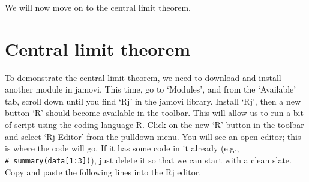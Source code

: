 \documentclass[
  openany]{krantz}
\begin{document}
\begin{verbatim}






\end{verbatim}

We will now move on to the central limit theorem.

\hypertarget{central-limit-theorem}{%
\section{Central limit theorem}\label{central-limit-theorem}}

To demonstrate the central limit theorem, we need to download and install another module in jamovi.
This time, go to `Modules', and from the `Available' tab, scroll down until you find `Rj' in the jamovi library.
Install `Rj', then a new button `R' should become available in the toolbar.
This will allow us to run a bit of script using the coding language R.
Click on the new `R' button in the toolbar and select `Rj Editor' from the pulldown menu.
You will see an open editor; this is where the code will go.
If it has some code in it already (e.g., \texttt{\#\ summary(data{[}1:3{]})}), just delete it so that we can start with a clean slate.
Copy and paste the following lines into the Rj editor.
\end{document}
